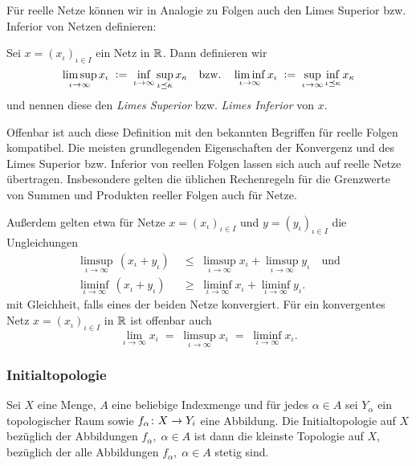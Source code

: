 \documentclass[../main/main.tex]{subfiles}
\begin{document}
	Für reelle Netze können wir in Analogie zu Folgen auch den Limes Superior bzw. Inferior von Netzen definieren:
	
	\begin{Definition}
		Sei $x = (x_\iota)_{\iota \in I}$ ein Netz in $\mathbb{R}$. Dann definieren wir 
		\[ \limsup_{\iota \to \infty} x_\iota \; \vcentcolon = \; \inf_{\iota \to \infty} \sup_{\iota \preceq \kappa} x_\kappa \quad \text{bzw.} \quad 
		\liminf_{\iota \to \infty} x_\iota \; \vcentcolon = \; \sup_{\iota \to \infty} \inf_{\iota \preceq \kappa} x_\kappa \]
		und nennen diese den \emph{Limes Superior} bzw. \emph{Limes Inferior} von $x$.
	\end{Definition}
	
	\begin{Bemerkung}
		Offenbar ist auch diese Definition mit den bekannten Begriffen für reelle Folgen kompatibel. Die meisten grundlegenden Eigenschaften der Konvergenz und des 
		Limes Superior bzw. Inferior von reellen Folgen lassen sich auch auf reelle Netze übertragen. 
		Insbesondere gelten die üblichen Rechenregeln für die Grenzwerte von Summen und Produkten reeller Folgen auch für Netze.
		
		Außerdem gelten etwa für Netze $x = (x_\iota)_{\iota \in I}$ und
		$y = (y_\iota)_{\iota \in I}$ die Ungleichungen
		\begin{align*}
			\limsup_{\iota \to \infty} \, (x_\iota + y_\iota) \; &\leq \; \limsup_{\iota \to \infty} x_\iota + \limsup_{\iota \to \infty} y_\iota \quad \text{und}\\
			\liminf_{\iota \to \infty} \, (x_\iota + y_\iota) \; &\geq \; \liminf_{\iota \to \infty} x_\iota + \liminf_{\iota \to \infty} y_\iota \text{.}
		\end{align*}
		mit Gleichheit, falls eines der beiden Netze konvergiert.
		Für ein konvergentes Netz $x = (x_\iota)_{\iota \in I}$ in $\mathbb{R}$ ist offenbar auch
		\[ \lim_{\iota \to \infty} x_\iota \; = \; \limsup_{\iota \to \infty} x_\iota \; = \; \liminf_{\iota \to \infty} x_\iota \text{.} \]
	\end{Bemerkung}
	
	\subsubsection*{Initialtopologie}
	
	\begin{Definition}[Initialtopologie]
		\label{def:initialtopology}
		Sei $X$ eine Menge, $A$ eine beliebige Indexmenge und für jedes $\alpha \in A$ sei $Y_\alpha$ ein topologischer Raum sowie $f_\alpha \colon X \to Y_i$ eine Abbildung.
		Die Initialtopologie auf $X$ bezüglich der Abbildungen $f_\alpha, \; \alpha \in A$ ist dann die kleinste Topologie auf $X$, bezüglich der alle Abbildungen 
		$f_\alpha, \; \alpha \in A$ stetig sind.
	\end{Definition}
\end{document}
